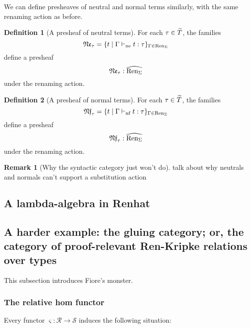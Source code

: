 \documentclass[12pt,twoside]{reedthesis}
\theoremstyle{definition}
\newtheorem{definition}{Definition}
\newtheorem{remark}{Remark}
\theoremstyle{remark}
\theoremstyle{plain}
\begin{document}
We can define presheaves of neutral and normal terms similarly, with the same
renaming action as before.

\newcommand{\nfdash}{\vdash_\textrm{nf}}
\newcommand{\nedash}{\vdash_\textrm{ne}}

\begin{definition}[A presheaf of neutral terms]
  For each $\tau \in \widetilde{T}$, the families
  \[
    \mathfrak{Ne}_{\tau} = \{ t \mid \Gamma \nedash t : \tau \}_{\Gamma \in \ren}
  \]
  define a presheaf
  \[ \mathfrak{Ne}_{\tau} : \widehat{\text{Ren}_\Sigma} \]
  under the renaming action.
\end{definition}

\begin{definition}[A presheaf of normal terms]
  For each $\tau \in \widetilde{T}$, the families
  \[
    \mathfrak{Nf}_{\tau} = \{ t \mid \Gamma \nfdash t : \tau \}_{\Gamma \in \ren}
  \]
  define a presheaf
  \[ \mathfrak{Nf}_{\tau} : \widehat{\text{Ren}_\Sigma}\]
  under the renaming action.
\end{definition}

\newcommand{\nfpsh}{\mathfrak{Nf}_\tau}
\newcommand{\nepsh}{\mathfrak{Ne}_\tau}

\begin{remark}[Why the syntactic category just won't do]
  talk about why neutrals and normals can't support a substitution action
\end{remark}

\subsection{A lambda-algebra in Renhat}




\subsection{A harder example: the gluing category; or, the category of proof-relevant Ren-Kripke relations over types}
This subsection introduces Fiore's monster.
\subsubsection{The relative hom functor}
Every functor \( \varsigma : \mathcal{R} \rightarrow \mathcal{S} \) induces the following
situation:
\end{document}
